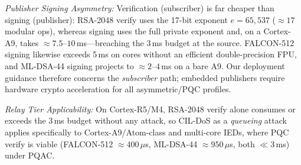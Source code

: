 \documentclass[journal]{IEEEtran}
\begin{document}
\textit{Publisher Signing Asymmetry:} Verification (subscriber) is far cheaper than signing (publisher): RSA-2048 verify uses the 17-bit exponent $e=65{,}537$ ($\approx 17$ modular ops), whereas signing uses the full private exponent and, on a Cortex-A9, takes $\approx 7.5\text{--}10$\,ms---breaching the 3\,ms budget at the source. FALCON-512 signing likewise exceeds 5\,ms on cores without an efficient double-precision FPU, and ML-DSA-44 signing projects to $\approx 2\text{--}4$\,ms on a bare A9. Our deployment guidance therefore concerns the \emph{subscriber} path; embedded publishers require hardware crypto acceleration for all asymmetric/PQC profiles.

\textit{Relay Tier Applicability:} On Cortex-R5/M4, RSA-2048 verify alone consumes or exceeds the 3\,ms budget without any attack, so CIL-DoS as a \emph{queueing} attack applies specifically to Cortex-A9/Atom-class and multi-core IEDs, where PQC verify is viable (FALCON-512 $\approx 400\,\mu$s, ML-DSA-44 $\approx 950\,\mu$s, both $\ll 3$\,ms) under PQAC.

\begin{table}[t]
\centering
\caption{CIL-DoS Saturation Across Hardware Tiers (RSA-2048 verify; ESP32 and host rows measured, others projected)}
\label{tab:hardware_scaling}
\scriptsize
{}
\end{table}
\end{document}
